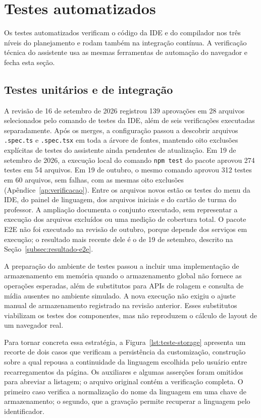 \section{Testes automatizados}
\label{sec:testes-automatizados}

Os testes automatizados verificam o código da IDE e do compilador nos três níveis do planejamento e rodam também na integração contínua. A verificação técnica do assistente usa as mesmas ferramentas de automação do navegador e fecha esta seção.

\subsection{Testes unitários e de integração}
\label{sec:testes-unitarios}

A revisão de 16 de setembro de 2026 registrou 139 aprovações em 28 arquivos selecionados pelo comando de testes da IDE, além de seis verificações executadas separadamente. Após os merges, a configuração passou a descobrir arquivos \texttt{.spec.ts} e \texttt{.spec.tsx} em toda a árvore de fontes, mantendo oito exclusões explícitas de testes do assistente ainda pendentes de atualização. Em 19 de setembro de 2026, a execução local do comando \texttt{npm test} do pacote aprovou 274 testes em 54 arquivos. Em 19 de outubro, o mesmo comando aprovou 312 testes em 60 arquivos, sem falhas, com as mesmas oito exclusões (Apêndice~\ref{ap:verificacao}). Entre os arquivos novos estão os testes do menu da IDE, do painel de linguagem, dos arquivos iniciais e do cartão de turma do professor. A ampliação documenta o conjunto executado, sem representar a execução dos arquivos excluídos ou uma medição de cobertura total. O pacote E2E não foi executado na revisão de outubro, porque depende dos serviços em execução; o resultado mais recente dele é o de 19 de setembro, descrito na Seção~\ref{subsec:resultado-e2e}.

A preparação do ambiente de testes passou a incluir uma implementação de armazenamento em memória quando o armazenamento global não fornece as operações esperadas, além de substitutos para APIs de rolagem e consulta de mídia ausentes no ambiente simulado. A nova execução não exigiu o ajuste manual de armazenamento registrado na revisão anterior. Esses substitutos viabilizam os testes dos componentes, mas não reproduzem o cálculo de layout de um navegador real.

Para tornar concreta essa estratégia, a Figura~\ref{lst:teste-storage} apresenta um recorte de dois casos que verificam a persistência da customização, construção sobre a qual repousa a continuidade da linguagem escolhida pelo usuário entre recarregamentos da página. Os auxiliares e algumas asserções foram omitidos para abreviar a listagem; o arquivo original contém a verificação completa. O primeiro caso verifica a normalização do nome da linguagem em uma chave de armazenamento; o segundo, que a gravação permite recuperar a linguagem pelo identificador.

